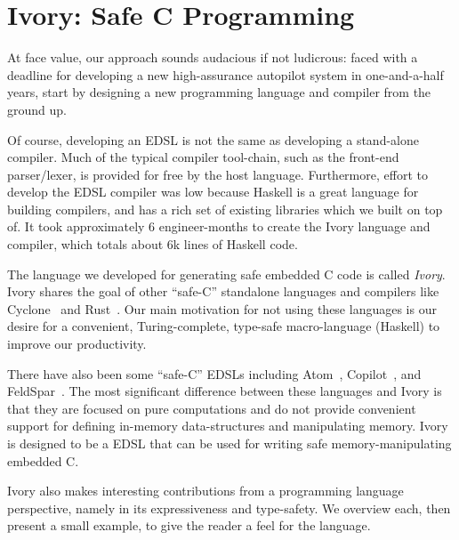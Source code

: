 \section{Ivory: Safe C Programming}
\label{sec:ivory}

At face value, our approach sounds audacious if not ludicrous: faced with a
deadline for developing a new high-assurance autopilot system in one-and-a-half
years, start by designing a new programming language and compiler from the
ground up.

Of course, developing an EDSL is not the same as developing a stand-alone
compiler.  Much of the typical compiler tool-chain, such as the front-end
parser/lexer, is provided for free by the host language.  Furthermore, effort
to develop the EDSL compiler was low because Haskell is a great language for
building compilers, and has a rich set of existing libraries
which we built on top of. It took approximately 6 engineer-months to create the
Ivory language and compiler, which totals about 6k lines of Haskell code.

The language we developed for generating safe embedded C code is called
\emph{Ivory}.  Ivory shares the goal of other ``safe-C'' standalone languages
and compilers like Cyclone~\cite{cyclone} and Rust~\cite{rust}.  Our main
motivation for not using these languages is our desire for a convenient,
Turing-complete, type-safe macro-language (Haskell) to improve our productivity.

There have also been some ``safe-C'' EDSLs including Atom~\cite{atom},
Copilot~\cite{copilot}, and FeldSpar~\cite{feldspar1}.  The most significant
difference between these languages and Ivory is that they are focused on pure
computations and do not provide convenient support for defining in-memory
data-structures and manipulating memory.  Ivory is designed to be a
EDSL that can be used for writing safe memory-manipulating embedded C.

Ivory also makes interesting contributions from a programming language
perspective, namely in its expressiveness and type-safety.  We overview each,
then present a small example, to give the reader a feel for the language.

